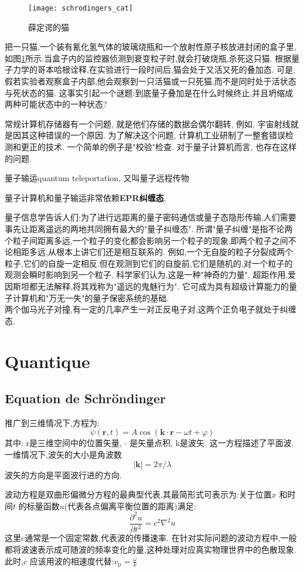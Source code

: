 \documentclass[openany]{book}
\begin{document}
\begin{figure}[htbp]
		\centering
		\texttt{[image: schrodingers\_cat]}
		\caption{薛定谔的猫}
		\label{fig.cat}
\end{figure}
把一只猫,一个装有氰化氢气体的玻璃烧瓶和一个放射性原子核放进封闭的盒子里, 如图\ref{fig.cat}所示.当盒子内的监控器侦测到衰变粒子时,就会打破烧瓶,杀死这只猫.
根据量子力学的哥本哈根诠释,在实验进行一段时间后,猫会处于又活又死的叠加态.
可是,假若实验者观察盒子内部,他会观察到一只活猫或一只死猫,而不是同时处于活状态与死状态的猫.
这事实引起一个谜题:到底量子叠加是在什么时候终止,并且坍缩成两种可能状态中的一种状态?

常规计算机存储器有一个问题, 就是他们存储的数据会偶尔翻转, 例如, 宇宙射线就是因其这种错误的一个原因. 为了解决这个问题, 计算机工业研制了一整套错误检测和更正的技术. 一个简单的例子是"校验"检查. 对于量子计算机而言, 也存在这样的问题.

量子输运quantum teleportation, 又叫量子远程传物

量子计算机和量子输运非常依赖\textbf{EPR纠缠态}.

量子信息学告诉人们:为了进行远距离的量子密码通信或量子态隐形传输,人们需要事先让距离遥远的两地共同拥有最大的"量子纠缠态".
所谓"量子纠缠"是指不论两个粒子间距离多远,一个粒子的变化都会影响另一个粒子的现象,即两个粒子之间不论相距多远,从根本上讲它们还是相互联系的.
例如,一个无自旋的粒子分裂成两个粒子,它们的自旋一定相反.但在观测到它们的自旋前,它们是随机的,对一个粒子的观测会瞬时影响到另一个粒子.
科学家们认为,这是一种"神奇的力量", 超距作用,爱因斯坦都无法解释,将其戏称为"遥远的鬼魅行为".
它可成为具有超级计算能力的量子计算机和"万无一失"的量子保密系统的基础.\\
两个伽马光子对撞,有一定的几率产生一对正反电子对,这两个正负电子就处于纠缠态.
\chapter{Quantique}
\section{Equation de Schr\"ondinger}
推广到三维情况下,方程为:
$$
\psi \left({\mathbf r}, t \right) = A \cos \left({\mathbf k} \cdot {\mathbf r} - \omega t + \varphi \right)
$$
其中:
r是三维空间中的位置矢量,
$\cdot$ 是矢量点积,
k是波矢.
这一方程描述了平面波.一维情况下,波矢的大小是角波数
$$|{\mathbf k}| = 2\pi/\lambda$$
波矢的方向是平面波行进的方向.

波动方程是双曲形偏微分方程的最典型代表,其最简形式可表示为:关于位置$x$ 和时间$t$ 的标量函数$u$(代表各点偏离平衡位置的距离)满足:
$$
\dfrac{\partial^2 u}{\partial t^2} = c^2 \nabla^2u
$$
这里c通常是一个固定常数,代表波的传播速率.
在针对实际问题的波动方程中,一般都将波速表示成可随波的频率变化的量,这种处理对应真实物理世界中的色散现象.此时,$ c$  应该用波的相速度代替:$v_\mathrm{p} = \frac{\omega}{k}$
\end{document}
